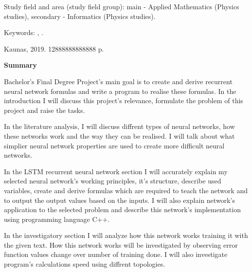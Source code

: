 Study field and area (study field group): main - Applied Mathematics (Physics studies), secondary - Informatics (Physics studies).

Keywords: , .

Kaunas, 2019. 12888888888888 p.

\begin{center}
\textbf{Summary}
\end{center}


\clearpage

Bachelor's Final Degree Project's main goal is to create and derive recurrent neural network formulas and write a program to realise these formulas. In the introduction I will discuss this project's relevance, formulate the problem of this project and raise the tasks.

In the literature analysis, I will discuss diffrent types of neural networks, how these networks work and the way they can be realised. I will talk about what simplier neural network properties are used to create more difficult neural networks.

In the LSTM recurrent neural network section I will accurately explain my selected neural network's working principles, it's structure, describe used variables, create and derive formulas which are required to teach the network and to output the output values based on the inputs. I will also explain network's application to the selected problem and describe this network's implementation using programming language C++.

In the investigatory section I will analyze how this network works training it with the given text. How this network works will be investigated by observing error function values change over number of training done. I will also investigate program's calculations speed using diffrent topologies. 

